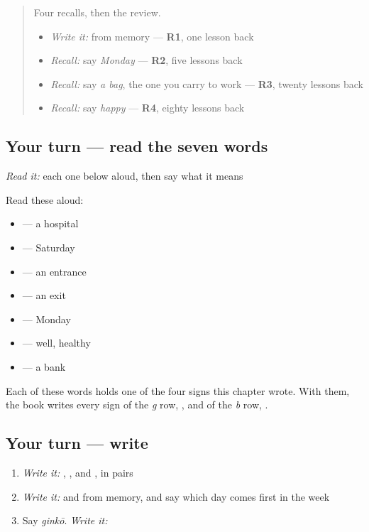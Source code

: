 \begin{quote}
Four recalls, then the review.

\begin{itemize}
\raggedright
  \item \emph{Write it:} \textbf{} from memory — \textbf{R1}, one lesson back
  \item \emph{Recall:} say \emph{Monday} — \textbf{R2}, five lessons back
  \item \emph{Recall:} say \emph{a bag}, the one you carry to work — \textbf{R3}, twenty lessons back
  \item \emph{Recall:} say \emph{happy} — \textbf{R4}, eighty lessons back
\end{itemize}
\end{quote}

\subsection*{Your turn — read the seven words}
\emph{Read it:} each one below aloud, then say what it means

Read these aloud:

\begin{itemize}
\raggedright
  \item \textbf{} — a hospital
  \item \textbf{} — Saturday
  \item \textbf{} — an entrance
  \item \textbf{} — an exit
  \item \textbf{} — Monday
  \item \textbf{} — well, healthy
  \item \textbf{} — a bank
\end{itemize}

Each of these words holds one of the four signs this chapter wrote. With them, the book writes every sign of the \emph{g} row, \textbf{    }, and of the \emph{b} row, \textbf{    }.

\subsection*{Your turn — write}
\begin{enumerate}
\raggedright
  \item \emph{Write it:} \textbf{ }, \textbf{ }, \textbf{ } and \textbf{ }, in pairs
  \item \emph{Write it:} \textbf{} and \textbf{} from memory, and say which day comes first in the week
  \item Say \emph{ginkō}. \emph{Write it:} \textbf{}
\end{enumerate}

